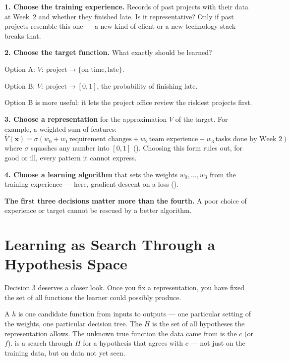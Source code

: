 \begin{worked}
\textbf{1. Choose the training experience.} Records of past projects with their
data at Week~2 and whether they finished late. Is it representative? Only if past
projects resemble this one --- a new kind of client or a new technology stack
breaks that.

\textbf{2. Choose the target function.} What exactly should be learned?
\begin{tight}
  \item Option A: $V:\ \text{project} \to \{\text{on time}, \text{late}\}$.
  \item Option B: $V:\ \text{project} \to [0,1]$, the probability of finishing late.
\end{tight}
Option B is more useful: it lets the project office review the riskiest projects
first.

\textbf{3. Choose a representation} for the approximation $\hat{V}$ of the
target. For example, a weighted sum of features:
\[
\hat{V}(\mathbf{x}) = \sigma(w_0 + w_1\, \text{requirement changes} + w_2\,
\text{team experience} + w_3\, \text{tasks done by Week 2})
\]
where $\sigma$ squashes any number into $[0,1]$ (). Choosing this
form rules out, for good or ill, every pattern it cannot express.

\textbf{4. Choose a learning algorithm} that sets the weights $w_0, \dots, w_3$
from the training experience --- here, gradient descent on a loss
().

\smallskip
\textbf{The first three decisions matter more than the fourth.} A poor choice
of experience or target cannot be rescued by a better algorithm.
\end{worked}

\section{Learning as Search Through a Hypothesis Space}

Decision 3 deserves a closer look. Once you fix a representation, you have fixed
the set of all functions the learner could possibly produce.

\begin{definitionbox}
A  $h$ is one candidate function from inputs to outputs --- one
particular setting of the weights, one particular decision tree. The
 $H$ is the set of all hypotheses the representation
allows. The unknown true function the data came from is the  $c$ (or $f$).  is a search through $H$ for a
hypothesis that agrees with $c$ --- not just on the training data, but on data
not yet seen.
\end{definitionbox}

